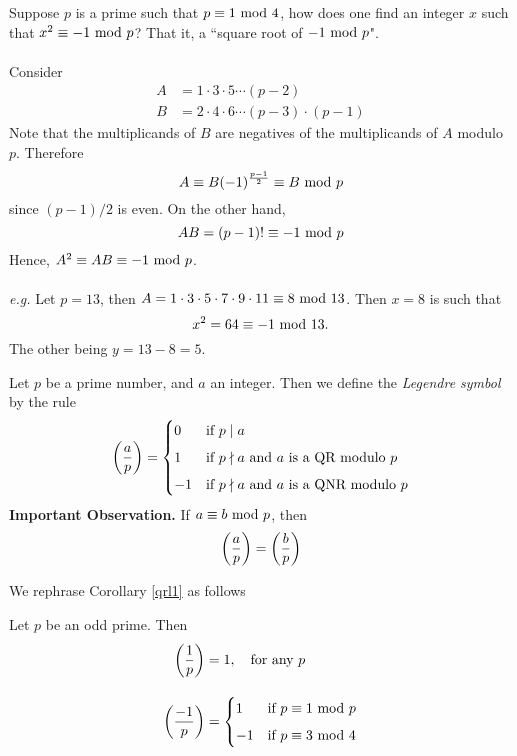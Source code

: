 \vspace*{1em}

\begin{remark}
Suppose $p$ is a prime such that $p \equiv 1 \text{ mod }{4}$, how does one find an integer $x$ such that $x^2 \equiv -1\text{ mod }{p}$? That it, a ``square root of $-1\text{ mod }{p}$".\\
\\
Consider
\begin{align*}
A &= 1\cdot 3\cdot 5\cdots (p-2)\\[0.5em]
B &= 2\cdot 4\cdot 6\cdots (p-3)\cdot (p-1)
\end{align*}
Note that the multiplicands of $B$ are negatives of the multiplicands of $A$ modulo $p$. Therefore
\[A \equiv B(-1)^{\frac{p-1}{2}} \equiv B \text{ mod }{p}\]
since $(p-1)/2$ is even. On the other hand, 
\[AB = (p-1)! \equiv -1\text{ mod }{p}\]
Hence, $A^2 \equiv AB \equiv -1\text{ mod }{p}$.\\
\\
\emph{e.g.} Let $p = 13$, then $A = 1\cdot 3\cdot 5\cdot 7\cdot 9\cdot 11 \equiv 8\text{ mod }{13}$. Then $x = 8$ is such that \[x^2 = 64 \equiv -1\text{ mod }{13}.\]
The other being $y = 13 - 8 = 5$.
\end{remark}

\vspace*{1.5em}

\begin{definition}
Let $p$ be a prime number, and $a$ an integer. Then we define the \emph{Legendre symbol} by the rule
\[\bigg(\dfrac{a}{p}\bigg) = \begin{cases}0 & \text{if $p\mid a$}\\[0.5em] 1 & \text{if $p\nmid a$ and $a$ is a QR modulo $p$}\\[0.5em] -1 & \text{if $p\nmid a$ and $a$ is a QNR modulo $p$} \end{cases}\]
{\bf Important Observation.} If $a \equiv b\text{ mod }{p}$, then
\[\bigg(\dfrac{a}{p}\bigg) = \bigg(\dfrac{b}{p}\bigg)\]
\end{definition}

\vspace*{1.5em}

We rephrase Corollary \ref{qrl1} as follows

\begin{corollary}
Let $p$ be an odd prime. Then
\begin{align*}
\bigg(\dfrac{1}{p}\bigg) &= 1,\quad \text{for any $p$}\\[1em]
\bigg(\dfrac{-1}{p}\bigg) &= \begin{cases}1 & \text{if $p\equiv 1 \text{ mod }{p}$}\\[0.5em] -1 & \text{if $p\equiv 3 \text{ mod }{4}$} \end{cases}
\end{align*}
\end{corollary}


